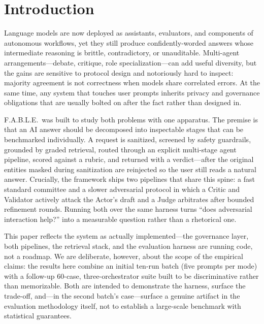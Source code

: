 \documentclass{article}
\begin{document}
\section{Introduction}
Language models are now deployed as assistants, evaluators, and components of autonomous
workflows, yet they still produce confidently-worded answers whose intermediate reasoning is
brittle, contradictory, or unauditable. Multi-agent arrangements---debate, critique, role
specialization---can add useful diversity, but the gains are sensitive to protocol design and
notoriously hard to inspect: majority agreement is not correctness when models share
correlated errors. At the same time, any system that touches user prompts inherits privacy
and governance obligations that are usually bolted on after the fact rather than designed in.

F.A.B.L.E.\ was built to study both problems with one apparatus. The premise is that an AI
answer should be decomposed into inspectable stages that can be benchmarked individually.
A request is sanitized, screened by safety guardrails, grounded by graded retrieval, routed
through an explicit multi-stage agent pipeline, scored against a rubric, and returned with a
verdict---after the original entities masked during sanitization are reinjected so the user
still reads a natural answer. Crucially, the framework ships two pipelines that share this
spine: a fast standard committee and a slower adversarial protocol in which a Critic and
Validator actively attack the Actor's draft and a Judge arbitrates after bounded refinement
rounds. Running both over the same harness turns ``does adversarial interaction help?'' into
a measurable question rather than a rhetorical one.

This paper reflects the system as actually implemented---the governance layer, both
pipelines, the retrieval stack, and the evaluation harness are running code, not a roadmap.
We are deliberate, however, about the scope of the empirical claims: the results here combine
an initial ten-run batch (five prompts per mode) with a follow-up 60-case, three-orchestrator
suite built to be discriminative rather than memorizable. Both are intended to demonstrate the
harness, surface the trade-off, and---in the second batch's case---surface a genuine artifact
in the evaluation methodology itself, not to establish a large-scale benchmark with statistical
guarantees.
\end{document}
